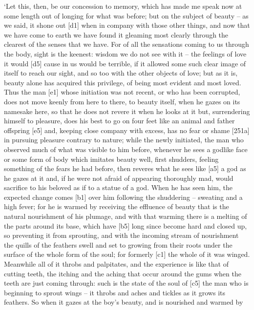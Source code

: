 ‘Let this, then, be our concession to memory, which has made me speak
now at some length out of longing for what was
before; but on the
subject of beauty -- as we said, it shone out {[}d1{]} when in company
with those other things, and now that we have come to earth we have
found it gleaming most clearly through the clearest of the senses that
we have. For of all the sensations coming to us through the body, sight
is the keenest: wisdom we do not see with it -- the feelings of love it
would {[}d5{]} cause in us would be terrible, if it allowed some such
clear image of itself to reach our sight, and so too with the other
objects of love; but as
it is, beauty alone has acquired this privilege, of being most evident
and most loved. Thus the man {[}e1{]} whose initiation was not recent,
or who has been corrupted, does not move keenly from here to there, to
beauty itself, when he gazes on its namesake here, so that he does not
revere it when he looks at it but, surrendering himself to pleasure,
does his best to go on four feet like an animal and father offspring
{[}e5{]} and, keeping close company with
excess, has no fear or
shame {[}251a{]} in pursuing pleasure contrary to nature; while the
newly initiated, the man who observed much of what was visible to him
before, whenever he sees a godlike face or some form of body which
imitates beauty well, first shudders, feeling something of the fears he
had before, then reveres what he sees like {[}a5{]} a god as he gazes at
it and, if he were not afraid of appearing thoroughly mad, would
sacrifice to his beloved as if to a statue of a god. When he has seen
him, the expected change comes {[}b1{]} over him following the
shuddering -- sweating and a high fever; for he is warmed by receiving
the effluence of beauty that is the natural nourishment of his plumage,
and with that warming there is a melting of the parts around its base,
which have {[}b5{]} long since become hard and closed up, so preventing
it from sprouting, and with the incoming stream of nourishment the
quills of the feathers swell and set to growing from their roots under
the surface of the whole form of the soul; for formerly {[}c1{]} the
whole of it was winged. Meanwhile all of it throbs and palpitates, and
the experience is like that of cutting teeth, the itching and the aching
that occur around the gums when the teeth are just coming through: such
is the state of the soul of {[}c5{]} the man who is beginning to sprout
wings -- it throbs and aches and tickles as it grows its feathers. So
when it gazes at the boy's beauty, and is nourished and warmed by
